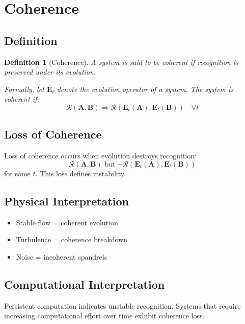\documentclass[12pt, oneside]{article}
\newtheorem{definition}[theorem]{Definition}
\newcommand{\R}{\mathcal{R}}
\begin{document}
\section{Coherence}

\subsection{Definition}

\begin{definition}[Coherence]
A system is said to be coherent if recognition is preserved under its evolution.

Formally, let $\mathbf{E}_t$ denote the evolution operator of a system. The system is coherent if:
\begin{equation}
\R(\mathbf{A},\mathbf{B}) \Rightarrow \R(\mathbf{E}_t(\mathbf{A}),\mathbf{E}_t(\mathbf{B})) \quad \forall t
\end{equation}
\end{definition}

\subsection{Loss of Coherence}

Loss of coherence occurs when evolution destroys recognition:
\begin{equation}
\R(\mathbf{A},\mathbf{B}) \text{ but } \neg\R(\mathbf{E}_t(\mathbf{A}),\mathbf{E}_t(\mathbf{B}))
\end{equation}
for some $t$. This loss defines instability.

\subsection{Physical Interpretation}

\begin{itemize}
    \item Stable flow = coherent evolution
    \item Turbulence = coherence breakdown
    \item Noise = incoherent spandrels
\end{itemize}

\subsection{Computational Interpretation}

Persistent computation indicates unstable recognition. Systems that require increasing computational effort over time exhibit coherence loss.
\end{document}
